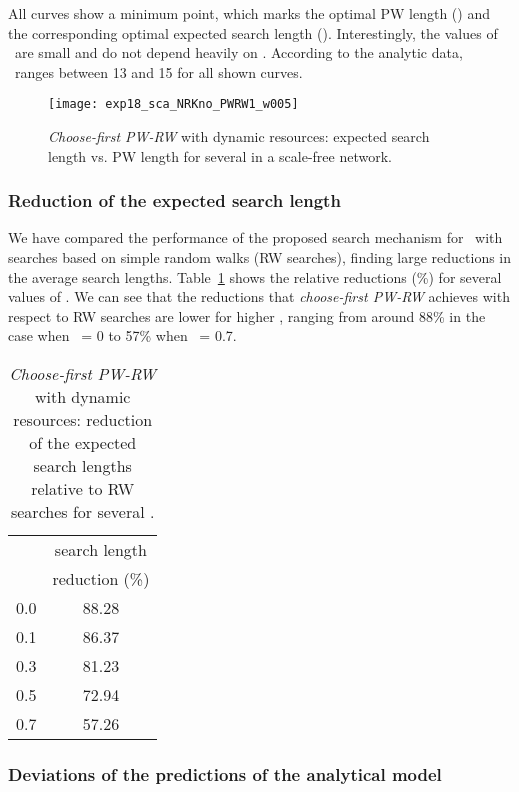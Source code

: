 \documentclass[]{elsarticle}
\begin{document}
All curves show a minimum point, which marks the optimal PW length (\sopt) and the corresponding optimal expected search length (\Lexpopt). Interestingly, the values of \sopt\ are small and do not depend heavily on \pd. According to the analytic data, \sopt\ ranges between 13 and 15 for all shown curves. \\

\begin{figure}
 \centering
 \texttt{[image: exp18\_sca\_NRKno\_PWRW1\_w005]}
 \caption{\emph{Choose-first PW-RW} with dynamic resources: expected search length  vs. PW length  for several  in a scale-free network.}
 \label{fig:scalefree_pw1}
\end{figure}


\subsubsection{Reduction of the expected search length}

We have compared the performance of the proposed search mechanism for \Lexpopt\ with searches based on simple random walks (RW searches), finding large reductions in the average search lengths. Table~\ref{tab:H_reduction_RW_PWRW} shows the relative reductions (\%) for several values of \pd.  We can see that the reductions that \emph{choose-first PW-RW} achieves with respect to RW searches are lower for higher \pd, ranging from around 88\% in the case when \pd\ = 0 to 57\% when \pd\ = 0.7.


\begin{table}
\centering
\begin{tabular}{|c|c|}
\hline
\rule{0pt}{11pt}   & search length \\ 
                & reduction (\%)\\ \hline
              0.0  &  88.28 \\
              0.1  &  86.37 \\
              0.3  &  81.23 \\
              0.5  &  72.94 \\
              0.7  &  57.26 \\
\hline
\end{tabular}
\caption{\emph{Choose-first PW-RW} with dynamic resources: reduction of the expected search lengths relative to RW searches for several \pd.}
\label{tab:H_reduction_RW_PWRW}
\end{table}


\subsubsection{Deviations of the predictions of the analytical model}
\label{sssec:deviations}
\end{document}
